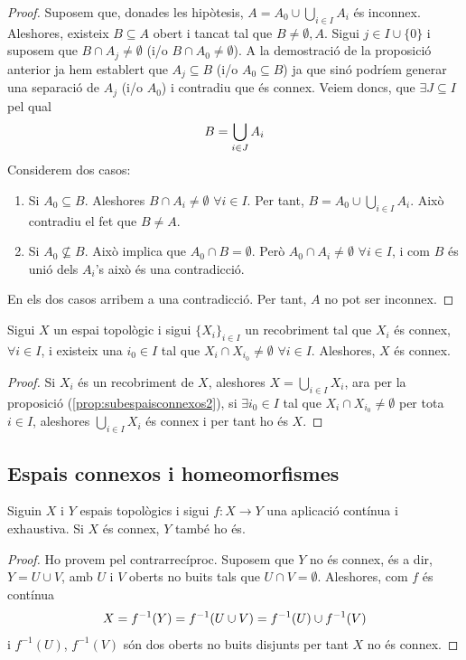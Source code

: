 \documentclass[../main.tex]{subfiles}
\begin{document}
\begin{proof}
Suposem que, donades les hipòtesis, $A = A_0\cup\bigcup_{i\in I}A_i$ és inconnex. Aleshores, existeix $B\subseteq A$ obert i tancat tal que $B\not=\emptyset,A$. Sigui $j\in I\cup\{0\}$ i suposem que $B\cap A_j\not=\emptyset$ (i/o $B\cap A_0\not=\emptyset$). A la demostració de la proposició anterior ja hem establert que $A_j\subseteq B$ (i/o $A_0\subseteq B$) ja que sinó podríem generar una separació de $A_j$ (i/o $A_0$) i contradiu que és connex. Veiem doncs, que $\exists J\subseteq I$ pel qual 
\begin{equation}
    \notag
    B = \bigcup_{i\in J}A_i
\end{equation}
Considerem dos casos:
\begin{enumerate}[1)]
    \item Si $A_0\subseteq B$. Aleshores $B\cap A_i\not=\emptyset$ $\forall i\in I$. Per tant, $B = A_0\cup\bigcup_{i\in I}A_i$. Això contradiu el fet que $B\not=A$.
    \item Si $A_0\not\subseteq B$. Això implica que $A_0\cap B = \emptyset$. Però $A_0\cap A_i\not=\emptyset$ $\forall i\in I$, i com $B$ és unió dels $A_i$'s això és una contradicció.
\end{enumerate}
En els dos casos arribem a una contradicció. Per tant, $A$ no pot ser inconnex.
\end{proof}

\begin{lema}
\label{lema:recobrimentsconnex} Sigui $X$ un espai topològic i sigui $\{X_i\}_{i\in I}$ un recobriment tal que $X_i$ és connex, $\forall i\in I$, i existeix una $i_0\in I$ tal que $X_i\cap X_{i_0}\not=\emptyset$ $\forall i\in I$. Aleshores, $X$ és connex.
\end{lema}
\begin{proof}
Si $X_i$ és un recobriment de $X$, aleshores $X = \bigcup_{i\in I} X_i$, ara per la proposició (\ref{prop:subespaisconnexos2}), si $\exists i_0\in I$ tal que $X_i\cap X_{i_0}\not=\emptyset$ per tota $i\in I$, aleshores $\bigcup_{i\in I}X_i$ és connex i per tant ho és $X$.
\end{proof}

\subsection{Espais connexos i homeomorfismes}

\begin{prop}
\label{prop:propietatespaisconnexos1} Siguin $X$ i $Y$ espais topològics i sigui $f:X\rightarrow Y$ una aplicació contínua i exhaustiva. Si $X$ és connex, $Y$ també ho és.
\end{prop}
\begin{proof}
Ho provem pel contrarrecíproc. Suposem que $Y$ no és connex, és a dir, $Y = U\cup V$, amb $U$ i $V$ oberts no buits tals que $U\cap V = \emptyset$. Aleshores, com $f$ és contínua
\begin{equation}
    \notag
    X = f^{-1}(Y) = f^{-1}(U\cup V) = f^{-1}(U)\cup f^{-1}(V)
\end{equation}
i $f^{-1}(U)$, $f^{-1}(V)$ són dos oberts no buits disjunts per tant $X$ no és connex.
\end{proof}
\end{document}
